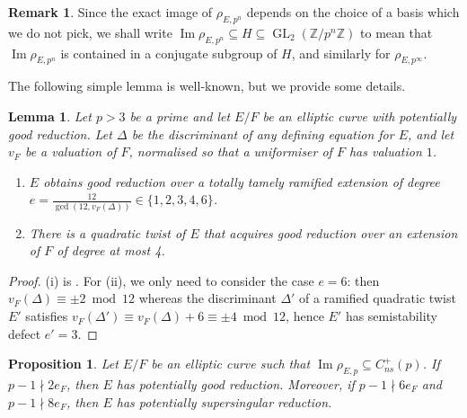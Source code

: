 \documentclass{amsart}
\newcommand{\op}[1]{\operatorname{#1}}
\newtheorem{lemma}[theorem]{Lemma}
\newtheorem{proposition}[theorem]{Proposition}
\theoremstyle{definition}
\newtheorem{remark}[theorem]{Remark}
\newcommand{\NRep}[1]{\operatorname{Im}\rho_{E,#1}}
\newcommand{\BaseField}{F}
\numberwithin{theorem}{section}
\numberwithin{equation}{section}
\begin{document}
\begin{remark}
    Since the exact image of $\rho_{E,p^n}$ depends on the choice of a basis which we do not pick, we shall write $\op{Im} \rho_{E,p^n} \subseteq H \subseteq \op{GL}_2(\mathbb{Z}/p^n\mathbb{Z})$ to mean that $\op{Im} \rho_{E,p^n}$ is contained in a conjugate subgroup of $H$, and similarly for $\rho_{E,p^\infty}$.
\end{remark}

The following simple lemma is well-known, but we provide some details.

\begin{lemma}\label{lemma: quadratic twist acquires good reduction over a small extension}
    Let $p > 3$ be a prime and let $E/F$ be an elliptic curve with potentially good reduction. Let $\Delta$ be the discriminant of any defining equation for $E$, and let $v_F$ be a valuation of $F$, normalised so that a uniformiser of $F$ has valuation $1$. 
    \begin{enumerate}
        \item $E$ obtains good reduction over a totally tamely ramified extension of degree $e=\frac{12}{\gcd(12,v_F(\Delta))} \in \{1,2,3,4,6\}$.
        \item There is a quadratic twist of $E$ that acquires good reduction over an extension of $F$ of degree at most 4.
    \end{enumerate}
\end{lemma}

\begin{proof}
    (i) is \cite[5.6 a1)]{MR387283}. For (ii), we only need to consider the case $e=6$: then $v_F(\Delta) \equiv \pm 2 \bmod{12}$ whereas the discriminant $\Delta'$ of a ramified quadratic twist $E'$ satisfies $v_F(\Delta') \equiv v_F(\Delta)+6 \equiv \pm 4 \bmod{12}$, hence $E'$ has semistability defect $e'=3$.
\end{proof}


\begin{proposition}\label{prop: potentially supersingular}
   Let $E/\BaseField$ be an elliptic curve such that $\NRep{p} \subseteq C_{ns}^+(p)$. If $p-1 \nmid 2e_\BaseField$, then $E$ has potentially good reduction. Moreover, if $p-1 \nmid 6e_\BaseField$ and $p-1 \nmid 8e_\BaseField$, then $E$ has potentially supersingular reduction.
\end{proposition}
\end{document}
